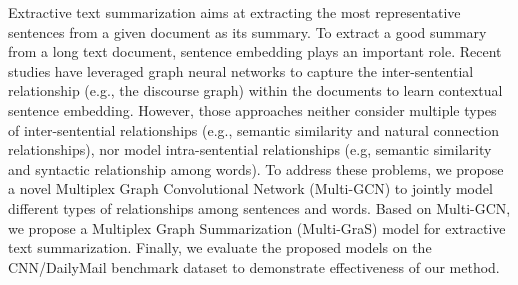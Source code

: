 Extractive text summarization aims at extracting the most representative sentences from a given document as its summary.  To extract a good summary from a long text document, sentence embedding plays an important role. Recent studies have leveraged graph neural networks to capture the inter-sentential relationship (e.g., the discourse graph) within the documents to learn contextual sentence embedding. However, those approaches neither consider multiple types of inter-sentential relationships (e.g., semantic similarity and natural connection relationships), nor model intra-sentential relationships (e.g, semantic similarity and syntactic relationship among words). To address these problems, we propose a novel Multiplex Graph Convolutional Network (Multi-GCN) to jointly model different types of relationships among sentences and words. Based on Multi-GCN, we propose a Multiplex Graph Summarization (Multi-GraS) model for extractive text summarization. Finally, we evaluate the proposed models on the CNN/DailyMail benchmark dataset to demonstrate effectiveness of our method.
